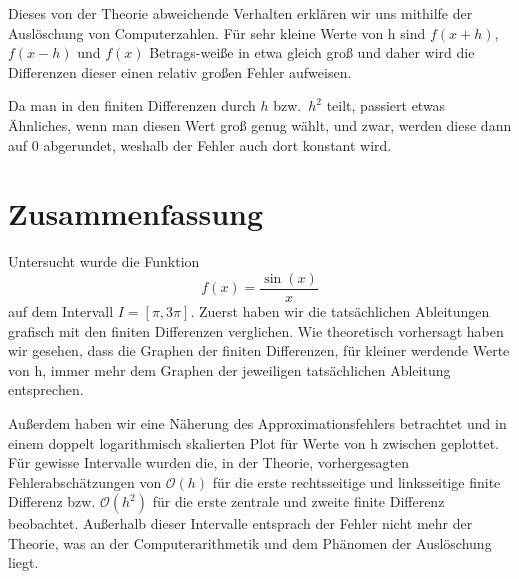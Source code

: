 \documentclass{scrartcl}
\newcommand{\BigO}{\mathcal{O}}
\theoremstyle{remark}
\begin{document}
Dieses von der Theorie abweichende Verhalten erklären wir uns mithilfe der
Auslöschung von Computerzahlen. Für sehr kleine Werte von h sind \(f(x + h)\),
\(f(x - h)\) und \(f(x)\) Betrags-weiße in etwa gleich groß und daher wird die
Differenzen dieser einen relativ großen Fehler aufweisen.

Da man in den finiten Differenzen durch \(h\) bzw.\ \(h^2\) teilt, passiert
etwas Ähnliches, wenn man diesen Wert groß genug wählt, und zwar, werden diese
dann auf 0 abgerundet, weshalb der Fehler auch dort konstant wird.

\section{Zusammenfassung}
Untersucht wurde die Funktion
\[
    f(x) = \frac{\sin(x)}{x}
\]
auf dem Intervall \(I = [\pi, 3\pi]\). Zuerst haben wir die tatsächlichen
  Ableitungen grafisch mit den finiten Differenzen verglichen. Wie theoretisch
  vorhersagt haben wir gesehen, dass die Graphen der finiten Differenzen, für
  kleiner werdende Werte von h, immer mehr dem Graphen der jeweiligen
  tatsächlichen Ableitung entsprechen.

Außerdem haben wir eine Näherung des Approximationsfehlers betrachtet und in
einem doppelt logarithmisch skalierten Plot für Werte von h zwischen
geplottet. Für gewisse Intervalle wurden die, in der Theorie, vorhergesagten
Fehlerabschätzungen von \(\BigO(h)\) für die erste rechtsseitige und
linksseitige finite Differenz bzw. \(\BigO(h^2)\) für die erste zentrale und
zweite finite Differenz beobachtet. Außerhalb dieser Intervalle entsprach der
Fehler nicht mehr der Theorie, was an der Computerarithmetik und dem Phänomen
der Auslöschung liegt.

\printbibliography%
\end{document}
